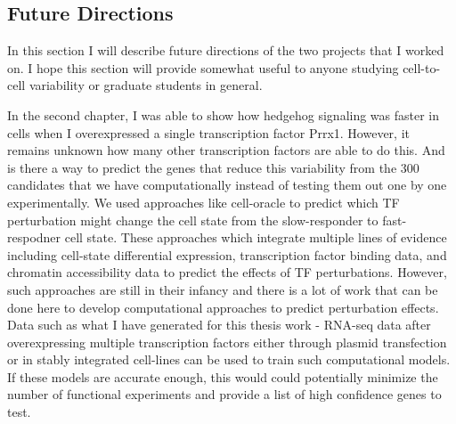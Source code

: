 \subsection{Future Directions}

In this section I will describe future directions of the two projects that I worked on. I hope this section will provide somewhat useful to anyone studying cell-to-cell variability or graduate students in general. 

In the second chapter, I was able to show how hedgehog signaling was faster in cells when I overexpressed a single transcription factor Prrx1. However, it remains unknown how many other transcription factors are able to do this. And is there a way to predict the genes that reduce this variability from the 300 candidates that we have computationally instead of testing them out one by one experimentally. We used approaches like cell-oracle \cite{kamimoto2020} to predict which TF perturbation might change the cell state from the slow-responder to fast-respodner cell state. These approaches which integrate multiple lines of evidence including cell-state differential expression, transcription factor binding data, and chromatin accessibility data to predict the effects of TF perturbations. However, such approaches are still in their infancy and there is a lot of work that can be done here to develop computational approaches to predict perturbation effects. Data such as what I have generated for this thesis work - RNA-seq data after overexpressing multiple transcription factors either through plasmid transfection or in stably integrated cell-lines can be used to train such computational models. If these models are accurate enough, this would could potentially minimize the number of functional experiments and provide a list of high confidence genes to test.

